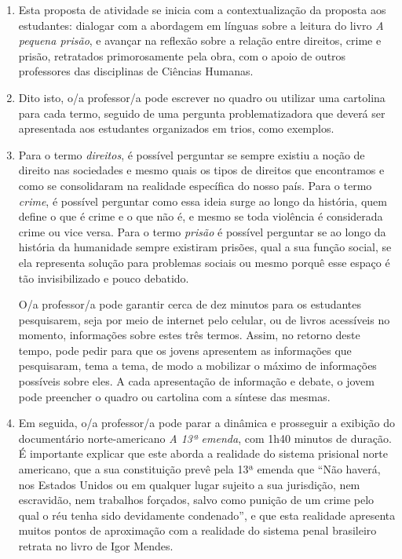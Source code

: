 \documentclass[11pt]{extarticle}
\begin{document}
\begin{enumerate}

\item Esta proposta de atividade se inicia com a
contextualização da proposta aos estudantes: dialogar com a abordagem em
línguas sobre a leitura do livro \emph{A pequena prisão}, e avançar na
reflexão sobre a relação entre direitos, crime e prisão, retratados
primorosamente pela obra, com o apoio de outros professores das disciplinas 
de Ciências Humanas. 

\item Dito isto, o/a professor/a pode escrever no
quadro ou utilizar uma cartolina para cada termo, seguido de uma
pergunta problematizadora que deverá ser apresentada aos estudantes
organizados em trios, como exemplos. 

\item Para o termo \emph{direitos}, é
possível perguntar se sempre existiu a noção de direito nas sociedades e
mesmo quais os tipos de direitos que encontramos e como se consolidaram
na realidade específica do nosso país. Para o termo \emph{crime}, é possível
perguntar como essa ideia surge ao longo da história, quem define o que
é crime e o que não é, e mesmo se toda violência é considerada crime ou
vice versa. Para o termo \emph{prisão} é possível perguntar se ao longo da
história da humanidade sempre existiram prisões, qual a sua função
social, se ela representa solução para problemas sociais ou mesmo porquê
esse espaço é tão invisibilizado e pouco debatido. 

O/a professor/a pode
garantir cerca de dez minutos para os estudantes pesquisarem, seja por
meio de internet pelo celular, ou de livros acessíveis no momento,
informações sobre estes três termos. Assim, no retorno deste tempo, pode
pedir para que os jovens apresentem as informações que pesquisaram, tema
a tema, de modo a mobilizar o máximo de informações possíveis sobre
eles. A cada apresentação de informação e debate, o jovem pode preencher
o quadro ou cartolina com a síntese das mesmas.

\item Em seguida, o/a professor/a pode parar a dinâmica e prosseguir a
exibição do documentário norte-americano \emph{A 13ª emenda}, com 1h40
minutos de duração. É importante explicar que este aborda a realidade do
sistema prisional norte americano, que a sua constituição prevê pela 13ª
emenda que ``Não haverá, nos Estados Unidos ou em qualquer lugar sujeito
a sua jurisdição, nem escravidão, nem trabalhos forçados, salvo como
punição de um crime pelo qual o réu tenha sido devidamente condenado'', e
que esta realidade apresenta muitos pontos de aproximação com a
realidade do sistema penal brasileiro retrata no livro de Igor Mendes.


\end{enumerate}
\end{document}
